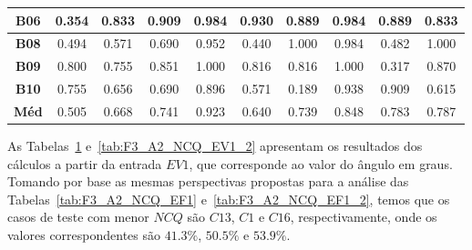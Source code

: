 \begin{table}[htbp]
\begin{tabular}{|c|ccccccccc|}
		\textbf{B06} & \multicolumn{1}{c|}{0.354} & \multicolumn{1}{c|}{0.833} & \multicolumn{1}{c|}{0.909} & \multicolumn{1}{c|}{0.984} & \multicolumn{1}{c|}{0.930} & \multicolumn{1}{c|}{0.889} & \multicolumn{1}{c|}{0.984} & \multicolumn{1}{c|}{0.889} & 0.833 \\ \hline
		\rowcolor[HTML]{F2F2F2} 
		\textbf{B08} & \multicolumn{1}{c|}{\cellcolor[HTML]{F2F2F2}0.494} & \multicolumn{1}{c|}{\cellcolor[HTML]{F2F2F2}0.571} & \multicolumn{1}{c|}{\cellcolor[HTML]{F2F2F2}0.690} & \multicolumn{1}{c|}{\cellcolor[HTML]{F2F2F2}0.952} & \multicolumn{1}{c|}{\cellcolor[HTML]{F2F2F2}0.440} & \multicolumn{1}{c|}{\cellcolor[HTML]{F2F2F2}1.000} & \multicolumn{1}{c|}{\cellcolor[HTML]{F2F2F2}0.984} & \multicolumn{1}{c|}{\cellcolor[HTML]{F2F2F2}0.482} & 1.000 \\ \hline
		\textbf{B09} & \multicolumn{1}{c|}{0.800} & \multicolumn{1}{c|}{0.755} & \multicolumn{1}{c|}{0.851} & \multicolumn{1}{c|}{1.000} & \multicolumn{1}{c|}{0.816} & \multicolumn{1}{c|}{0.816} & \multicolumn{1}{c|}{1.000} & \multicolumn{1}{c|}{0.317} & 0.870 \\ \hline
		\rowcolor[HTML]{F2F2F2} 
		\textbf{B10} & \multicolumn{1}{c|}{\cellcolor[HTML]{F2F2F2}0.755} & \multicolumn{1}{c|}{\cellcolor[HTML]{F2F2F2}0.656} & \multicolumn{1}{c|}{\cellcolor[HTML]{F2F2F2}0.690} & \multicolumn{1}{c|}{\cellcolor[HTML]{F2F2F2}0.896} & \multicolumn{1}{c|}{\cellcolor[HTML]{F2F2F2}0.571} & \multicolumn{1}{c|}{\cellcolor[HTML]{F2F2F2}0.189} & \multicolumn{1}{c|}{\cellcolor[HTML]{F2F2F2}0.938} & \multicolumn{1}{c|}{\cellcolor[HTML]{F2F2F2}0.909} & 0.615 \\ \hline
		\cellcolor[HTML]{F2F2F2}\textbf{Méd} & \multicolumn{1}{c|}{0.505} & \multicolumn{1}{c|}{0.668} & \multicolumn{1}{c|}{0.741} & \multicolumn{1}{c|}{0.923} & \multicolumn{1}{c|}{0.640} & \multicolumn{1}{c|}{0.739} & \multicolumn{1}{c|}{0.848} & \multicolumn{1}{c|}{0.783} & 0.787 \\ \hline
	\end{tabular}
	\label{tab:F3_A2_NCQ_EV1}
\end{table}

As Tabelas~\ref{tab:F3_A2_NCQ_EV1} e~\ref{tab:F3_A2_NCQ_EV1_2} apresentam os resultados dos cálculos a partir da entrada $EV1$, que corresponde ao valor do ângulo em graus. Tomando por base as mesmas perspectivas propostas para a análise das Tabelas~\ref{tab:F3_A2_NCQ_EF1} e~\ref{tab:F3_A2_NCQ_EF1_2}, temos que os casos de teste com menor $NCQ$ são $C13$, $C1$ e $C16$, respectivamente, onde os valores correspondentes são $41.3\%$, $50.5\%$ e $53.9\%$.

